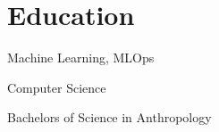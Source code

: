 \documentclass[letterpaper]{resume}
\begin{document}
\section{Education}

\begin{compactitem}[\null]
\item Machine Learning, MLOps
\end{compactitem}

\begin{compactitem}[\null]
\item Computer Science
\end{compactitem}

\begin{compactitem}[\null]
\item Bachelors of Science in Anthropology
\end{compactitem}
\end{document}

